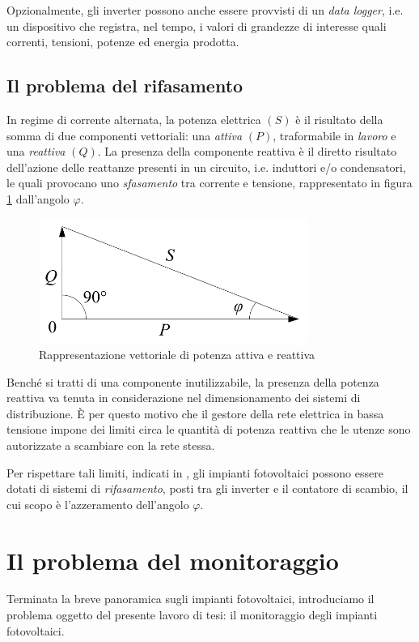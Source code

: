 %
Opzionalmente, gli inverter possono anche essere provvisti di un \emph{data logger}, 
i.e. un dispositivo che registra, nel tempo, i valori di grandezze di interesse quali 
correnti, tensioni, potenze ed energia prodotta.

%
\subsection{Il problema del rifasamento}
%
In regime di corrente alternata, la potenza elettrica $(S)$ \`e il risultato della 
somma di due componenti vettoriali: una \emph{attiva} $(P)$, traformabile in 
\emph{lavoro} e una \emph{reattiva} $(Q)$.
%
La presenza della componente reattiva \`e il diretto risultato dell'azione delle 
reattanze presenti in un circuito, i.e. induttori e/o condensatori, le quali 
provocano uno \emph{sfasamento} tra corrente e tensione, rappresentato in 
figura \ref{potenzaattivareattiva} dall'angolo $\varphi$.
%

%
\begin{figure}[!h]
\centering
\includegraphics[width=250pt]{img/apparent-power.png}
\caption{Rappresentazione vettoriale di potenza attiva e reattiva}
\label{potenzaattivareattiva}
\end{figure}
%
Bench\'e si tratti di una componente inutilizzabile, la presenza della potenza 
reattiva va tenuta in considerazione nel dimensionamento dei sistemi di 
distribuzione. \`E per questo motivo che il gestore della rete elettrica in 
bassa tensione impone dei limiti circa le quantit\`a di potenza reattiva 
che le utenze sono autorizzate a scambiare con la rete stessa.
%

%
Per rispettare tali limiti, indicati in \cite{criteriallacciamento}, gli impianti 
fotovoltaici possono essere dotati di sistemi di \emph{rifasamento}, posti 
tra gli inverter e il contatore di scambio, il cui scopo \`e l'azzeramento 
dell'angolo $\varphi$.
%

%
\section{Il problema del monitoraggio}
Terminata la breve panoramica sugli impianti fotovoltaici, introduciamo il 
problema oggetto del presente lavoro di tesi: il monitoraggio degli 
impianti fotovoltaici.
%

